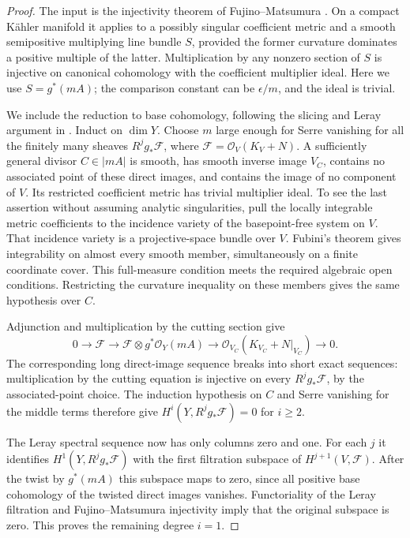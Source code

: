 \begin{proof}
The input is the injectivity theorem of Fujino--Matsumura
\cite[Theorem A]{FM2016}.  On a compact K\"ahler manifold it applies to a
possibly singular coefficient metric and a smooth semipositive multiplying
line bundle $S$, provided the former curvature dominates a positive
multiple of the latter.  Multiplication by any nonzero section of $S$
is injective on canonical cohomology with the coefficient multiplier
ideal.  Here we use $S=g^*(mA)$; the comparison constant can be
$\epsilon/m$, and the ideal is trivial.

We include the reduction to base cohomology, following the slicing and
Leray argument in \cite[proof of Proposition 1.9, Step 3]{FM2016}.
Induct on $\dim Y$.  Choose $m$ large enough for Serre vanishing for all
the finitely many sheaves $R^jg_*\mathcal F$, where
$\mathcal F=\mathcal O_V(K_V+N)$.  A sufficiently general divisor
$C\in|mA|$ is smooth, has smooth inverse image $V_C$, contains no
associated point of these direct images, and contains the image of no
component of $V$.  Its restricted coefficient metric has trivial
multiplier ideal.  To see the last assertion without assuming analytic
singularities, pull the locally integrable metric coefficients to the
incidence variety of the basepoint-free system on $V$.  That incidence
variety is a projective-space bundle over $V$.  Fubini's theorem gives
integrability on almost every smooth member, simultaneously on a finite
coordinate cover.  This full-measure condition meets the required
algebraic open conditions.  Restricting the curvature inequality on
these members gives the same hypothesis over $C$.

Adjunction and multiplication by the cutting section give
\[
 0\longrightarrow\mathcal F\longrightarrow
 \mathcal F\otimes g^*\mathcal O_Y(mA)\longrightarrow
 \mathcal O_{V_C}(K_{V_C}+N|_{V_C})\longrightarrow0.
\]
The corresponding long direct-image sequence breaks into short exact
sequences: multiplication by the cutting equation is injective on every
$R^jg_*\mathcal F$, by the associated-point choice.  The induction
hypothesis on $C$ and Serre vanishing for the middle terms therefore
give $H^i(Y,R^jg_*\mathcal F)=0$ for $i\ge2$.

The Leray spectral sequence now has only columns zero and one.  For
each $j$ it identifies $H^1(Y,R^jg_*\mathcal F)$ with the first
filtration subspace of $H^{j+1}(V,\mathcal F)$.  After the twist by
$g^*(mA)$ this subspace maps to zero, since all positive base cohomology
of the twisted direct images vanishes.  Functoriality of the Leray
filtration and Fujino--Matsumura injectivity imply that the original
subspace is zero.  This proves the remaining degree $i=1$.
\end{proof}

